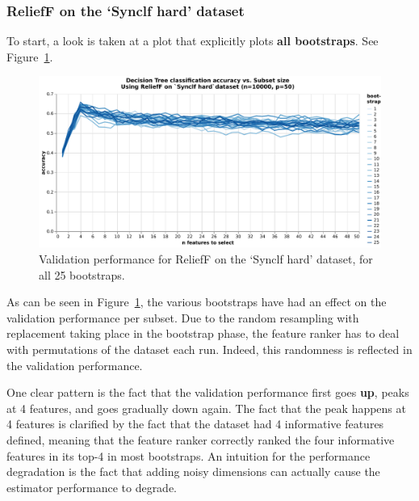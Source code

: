 \documentclass[../main.tex]{subfiles}
\begin{document}
\subsubsection{ReliefF on the `Synclf hard' dataset}
To start, a look is taken at a plot that explicitly plots \textbf{all bootstraps}. See Figure~\ref{fig:results-validation-dt-relieff}.

\begin{figure}[ht]
    \centering
    \includegraphics[width=\linewidth]{report/images/results-validation-dt-relieff.pdf}
    \caption{Validation performance for ReliefF on the `Synclf hard' dataset, for all 25 bootstraps.}
    \label{fig:results-validation-dt-relieff}
\end{figure}

As can be seen in Figure~\ref{fig:results-validation-dt-relieff}, the various bootstraps have had an effect on the validation performance per subset. Due to the random resampling with replacement taking place in the bootstrap phase, the feature ranker has to deal with permutations of the dataset each run. Indeed, this randomness is reflected in the validation performance.

One clear pattern is the fact that the validation performance first goes \textbf{up}, peaks at 4 features, and goes gradually down again. The fact that the peak happens at 4 features is clarified by the fact that the dataset had 4 informative features defined, meaning that the feature ranker correctly ranked the four informative features in its top-4 in most bootstraps. An intuition for the performance degradation is the fact that adding noisy dimensions can actually cause the estimator performance to degrade.
\end{document}
